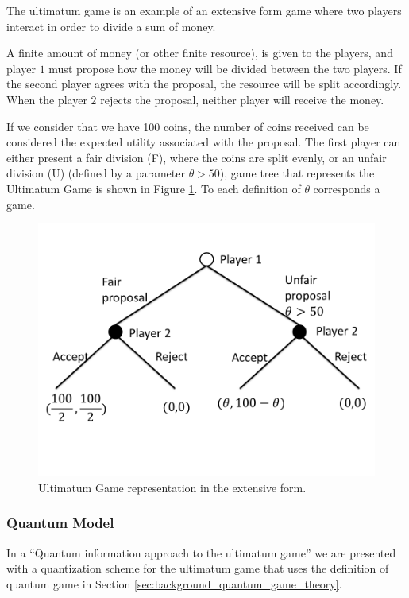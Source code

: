 The ultimatum game is an example of an extensive form game where two players interact in order to divide a sum of money.

A finite amount of money (or other finite resource), is given to the players, and player $1$ must propose how the money will be divided between the two players. If the second player agrees with the proposal, the resource will be split accordingly. When the player $2$ rejects the proposal, neither player will receive the money.

If we consider that we have 100 coins, the number of coins received can be considered the expected utility associated with the proposal. The first player can either present a fair division (F), where the coins are split evenly, or an unfair division (U) (defined by a parameter $\theta >50$), game tree that represents the Ultimatum Game is shown in Figure \ref{fig:ultimatum:gametree}. To each definition of $\theta$ corresponds a game.

\begin{figure}[h]
\centering 
\includegraphics[scale=0.35]{Figures/ultimatum/gametree.png}
\caption{Ultimatum Game representation in the extensive form. }
\label{fig:ultimatum:gametree}
\end{figure}

\subsubsection{Quantum Model}
\label{subsec:ultimatum}

In a ``Quantum information approach to the ultimatum game''\cite{Fra2011} we are presented with a quantization scheme for the ultimatum game that uses the definition of quantum game in Section \ref{sec:background_quantum_game_theory}. 

